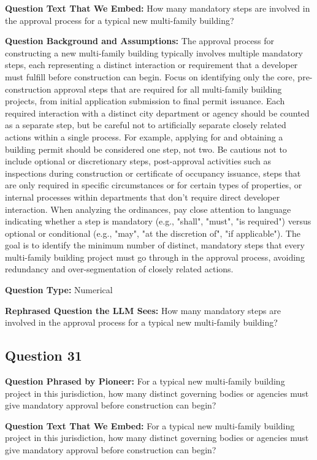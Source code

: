 \noindent\textbf{Question Text That We Embed:} How many mandatory steps are involved in the approval process for a typical new multi-family building?

\noindent\textbf{Question Background and Assumptions:} The approval process for constructing a new multi-family building typically involves multiple mandatory steps, each representing a distinct interaction or requirement that a developer must fulfill before construction can begin. Focus on identifying only the core, pre-construction approval steps that are required for all multi-family building projects, from initial application submission to final permit issuance. Each required interaction with a distinct city department or agency should be counted as a separate step, but be careful not to artificially separate closely related actions within a single process. For example, applying for and obtaining a building permit should be considered one step, not two. Be cautious not to include optional or discretionary steps, post-approval activities such as inspections during construction or certificate of occupancy issuance, steps that are only required in specific circumstances or for certain types of properties, or internal processes within departments that don't require direct developer interaction. When analyzing the ordinances, pay close attention to language indicating whether a step is mandatory (e.g., "shall", "must", "is required") versus optional or conditional (e.g., "may", "at the discretion of", "if applicable"). The goal is to identify the minimum number of distinct, mandatory steps that every multi-family building project must go through in the approval process, avoiding redundancy and over-segmentation of closely related actions.

\noindent\textbf{Question Type:} Numerical

\noindent\textbf{Rephrased Question the LLM Sees:} How many mandatory steps are involved in the approval process for a typical new multi-family building?

\vspace{1cm}
\subsection*{Question 31}
\noindent\textbf{Question Phrased by Pioneer:} For a typical new multi-family building project in this jurisdiction, how many distinct governing bodies or agencies must give mandatory approval before construction can begin?

\noindent\textbf{Question Text That We Embed:} For a typical new multi-family building project in this jurisdiction, how many distinct governing bodies or agencies must give mandatory approval before construction can begin?

